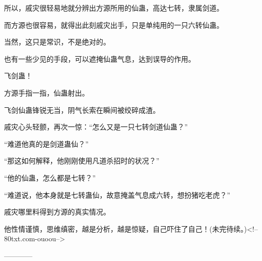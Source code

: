 \begin{this_body}
所以，戚灾很轻易地就分辨出方源所用的仙蛊，高达七转，隶属剑道。

而方源也很容易，就得出此刻戚灾出手，只是单纯用的一只六转仙蛊。

当然，这只是常识，不是绝对的。

也有一些少见的手段，可以遮掩仙蛊气息，达到误导的作用。

飞剑蛊！

方源手指一指，仙蛊射出。

飞剑仙蛊锋锐无当，阴气长索在瞬间被绞碎成渣。

戚灾心头轻颤，再次一惊：“怎么又是一只七转剑道仙蛊？”

“难道他真的是剑道蛊仙？”

“那这如何解释，他刚刚使用凡道杀招时的状况？”

“他的仙蛊，怎么都是七转？”

“难道说，他本身就是七转蛊仙，故意掩盖气息成六转，想扮猪吃老虎？”

戚灾哪里料得到方源的真实情况。

他性情谨慎，思维缜密，越是分析，越是惊疑，自己吓住了自己！(未完待续。)<!--80txt.com-ouoou-->

------------

\end{this_body}

